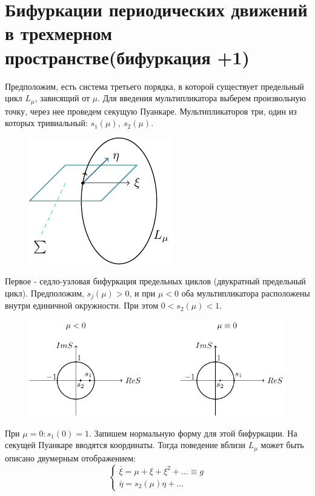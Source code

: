 \section{Бифуркации периодических движений в трехмерном пространстве(бифуркация +1)}
Предположим, есть система третьего порядка, в которой существует предельный цикл $L_{\mu}$, зависящий от $\mu$. Для введения мультипликатора выберем произвольную точку, через нее проведем секущую Пуанкаре. Мультипликаторов три, один из которых тривиальный: $s_1(\mu),~s_2(\mu)$.
\begin{figure} 
	\vspace{0.1em}
	\centering
	\includegraphics[scale=1]{fig/fig62.pdf}
	\vspace{-0.25em}
\end{figure}

Первое - седло-узловая бифуркация предельных циклов (двукратный предельный цикл). Предположим, $s_j(\mu)>0$, и при $\mu<0$ оба мультипликатора расположены внутри единичной окружности. При этом $0<s_2(\mu)<1$.
\begin{figure}[H]
	\centering
	\includegraphics[width=1\linewidth]{fig/fig63.pdf}   
\end{figure}

При $\mu=0: s_1(0)= 1$. Запишем нормальную форму для этой бифуркации. На секущей Пуанкаре вводятся координаты. Тогда поведение вблизи $L_{\mu}$ может быть описано двумерным отображением:
\begin{equation}
	\begin{cases}
		\stackrel{\_}{\xi}= \mu+\xi+\xi^2+\dots \equiv g\\
		\stackrel{\_}{\eta}= s_2(\mu)\eta+\dots
	\end{cases}
	\label{eq:109}	
\end{equation}

